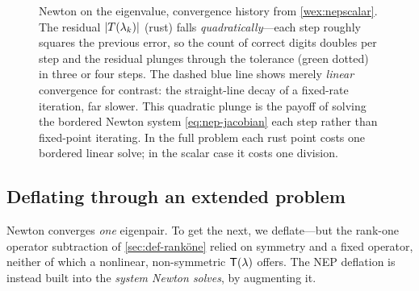 \begin{figure}[t]
\centering
{}
\caption[Quasi-Newton drives the eigenvalue residual to zero]{Newton on the
eigenvalue, convergence history from \cref{wex:nepscalar}. The residual
$\lvert T(\lambda_k)\rvert$ (rust) falls \emph{quadratically}---each step roughly squares
the previous error, so the count of correct digits doubles per step and the
residual plunges through the tolerance (green dotted) in three or four steps. The
dashed blue line shows merely \emph{linear} convergence for contrast: the
straight-line decay of a fixed-rate iteration, far slower. This quadratic plunge
is the payoff of solving the bordered Newton system \cref{eq:nep-jacobian} each
step rather than fixed-point iterating. In the full problem each rust point costs
one bordered linear solve; in the scalar case it costs one division.}
\label{fig:newton-residual}
\end{figure}

\subsection{Deflating through an extended problem}
\label{sec:def-extended}

Newton converges \emph{one} eigenpair. To get the next, we deflate---but the
rank-one operator subtraction of \cref{sec:def-ranköne} relied on symmetry and a
fixed operator, neither of which a nonlinear, non-symmetric $\mathsf{T}(\lambda)$
offers. The NEP deflation is instead built into the \emph{system Newton solves},
by augmenting it.

